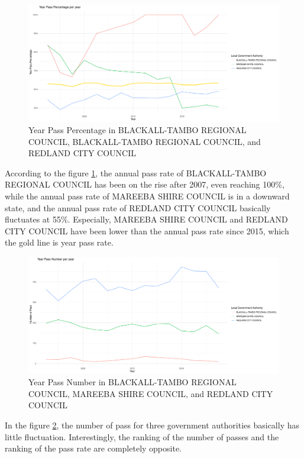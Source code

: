 \documentclass[11pt,a4paper,]{article}
\begin{document}
\begin{figure}
\centering
\includegraphics{Assignment4_files/figure-latex/Fig2-1.pdf}
\caption{\label{fig:Fig2}Year Pass Percentage in BLACKALL-TAMBO REGIONAL COUNCIL, BLACKALL-TAMBO REGIONAL COUNCIL, and REDLAND CITY COUNCIL}
\end{figure}

According to the figure \ref{fig:Fig2}, the annual pass rate of BLACKALL-TAMBO REGIONAL COUNCIL has been on the rise after 2007, even reaching 100\%, while the annual pass rate of MAREEBA SHIRE COUNCIL is in a downward state, and the annual pass rate of REDLAND CITY COUNCIL basically fluctuates at 55\%. Especially, MAREEBA SHIRE COUNCIL and REDLAND CITY COUNCIL have been lower than the annual pass rate since 2015, which the gold line is year pass rate.

\begin{figure}
\centering
\includegraphics{Assignment4_files/figure-latex/Fig3-1.pdf}
\caption{\label{fig:Fig3}Year Pass Number in BLACKALL-TAMBO REGIONAL COUNCIL, MAREEBA SHIRE COUNCIL, and REDLAND CITY COUNCIL}
\end{figure}

In the figure \ref{fig:Fig3}, the number of pass for three government authorities basically has little fluctuation. Interestingly, the ranking of the number of passes and the ranking of the pass rate are completely opposite.
\end{document}
